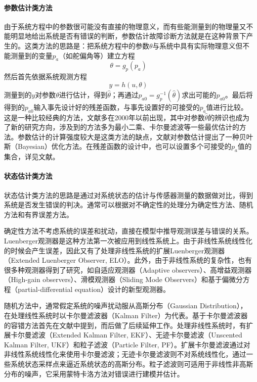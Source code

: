 \paragraph*{参数估计类方法}由于系统方程中的参数很可能没有直接的物理意义，而有些能测量到的物理量又不能明显地给出系统是否有错误的判断，参数估计故障诊断方法就是在这种背景下产生的。这类方法的思路是：把系统方程中的参数$\theta$与系统中具有实际物理意义但不能测量到的变量$p_a$（如舵偏角等）建立方程
$$\theta = g_p(p_a)$$
然后首先依据系统观测方程
$$y=h(u,\theta)$$
测量到的$y$对参数$\theta$进行估计，得到$\hat{\theta}$；再通过$p_{a0} = g_p^{-1}(\hat{\theta})$求出可能的$p_{a0}$。最后将得到的$p_{a0}$输入事先设计好的残差函数，与事先设置好的可接受的$p_a$值进行比较。这是一种比较经典的方法，文献多在2000年以前出现\cite{ISERMANN1984387,FRANK1990459,ISERMANN1993815,411478,BLOCH19951709}，其中对参数$\hat{\theta}$的辨识也成为了新的研究方向\cite{ISERMANN1993815,411478,BLOCH19951709}，涉及到的方法多为最小二乘、卡尔曼滤波等一些最优估计的方法。参数估计的计算强度较大是这类方法的缺点，文献\cite{Villemonteix2009Bayesian}对参数估计提出了一种贝叶斯（Bayesian）优化方法。在残差函数的设计中，也可以设置多个可接受的$p_a$值的集合，详见文献。

\paragraph*{状态估计类方法}状态估计类方法的思路是通过对系统状态的估计与传感器测量的数据做对比，得到系统是否发生错误的判决。通常可以根据对不确定性的处理分为确定性方法、随机方法和有界误差方法\cite{Marzat2012modelbased}。

确定性方法\cite{1098323,ALCORTAGARCIA1997663}不考虑系统的误差和扰动，直接在模型中推导观测误差与错误的关系。Luenberger观测器\cite{1098323}是这种方法第一次被应用到线性系统上。由于非线性系统线性化的时候会产生误差，因此又有了处理非线性系统的扩展Luenberger观测器（Extended
Luenberger Observer, ELO）\cite{Nejjari2008Extended,ZEITZ1987149}。此外，由于非线性系统的复杂性，也有很多种观测器得到了研究，如自适应观测器（Adaptive observers）\cite{878691,Zhang2010290}、高增益观测器（High-gain observers）\cite{Busvelle2002HIGH}、滑模观测器（Sliding Mode Observers）\cite{Edwards2011Sliding,1269645}和基于偏微分方程（partial-differential equation）设计的新型观测器\cite{5717995}。

随机方法中，通常假定系统的噪声扰动服从高斯分布（Gaussian Distribution），在处理线性系统时以卡尔曼滤波器（Kalman Filter）为代表。基于卡尔曼滤波器的容错方法首先在文献\cite{MEHRA1971637}中提到，而后\cite{NIKOUKHAH19941851,539440,willsky1986detection}做了后续延伸工作。处理非线性系统时，有扩展卡尔曼滤波（Extended Kalman Filter, EKF）、无迹卡尔曼滤波（Unscented Kalman Filter, UKF）和粒子滤波（Particle Filter, PF）。扩展卡尔曼滤波通过对非线性系统线性化来使用卡尔曼滤波\cite{CHANG19952861}；无迹卡尔曼滤波则不对系统线性化，通过一些系统状态采样点来逼近系统状态的高斯分布\cite{4252507,XIONG2005113}。粒子滤波则可适用于非线性非高斯分布的噪声，它采用蒙特卡洛方法对错误进行建模并估计\cite{1271398,971661}。

